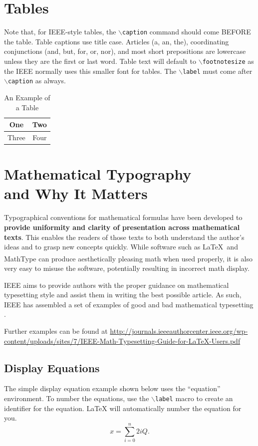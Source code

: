 \documentclass[journal,9pt]{IEEEtran}
\begin{document}
\section{Tables}
Note that, for IEEE-style tables, the
$\backslash${\tt{caption}} command should come BEFORE the table. Table captions use title case. Articles (a, an, the), coordinating conjunctions (and, but, for, or, nor), and most short prepositions are lowercase unless they are the first or last word. Table text will default to $\backslash${\tt{footnotesize}} as
the IEEE normally uses this smaller font for tables.
The $\backslash${\tt{label}} must come after $\backslash${\tt{caption}} as always.

\begin{table}[!t]
  \caption{An Example of a Table\label{tab:table1}}
  \centering
  \begin{tabular}{|c||c|}
    \hline
    One   & Two  \\
    \hline
    Three & Four \\
    \hline
  \end{tabular}
\end{table}


\section{Mathematical Typography \\ and Why It Matters}

Typographical conventions for mathematical formulas have been developed to {\bf provide uniformity and clarity of presentation across mathematical texts}. This enables the readers of those texts to both understand the author's ideas and to grasp new concepts quickly. While software such as \LaTeX \ and MathType\textsuperscript{\textregistered} can produce aesthetically pleasing math when used properly, it is also very easy to misuse the software, potentially resulting in incorrect math display.

IEEE aims to provide authors with the proper guidance on mathematical typesetting style and assist them in writing the best possible article. As such, IEEE has assembled a set of examples of good and bad mathematical typesetting \cite{ref1,ref2,ref3,ref4,ref5}.

Further examples can be found at \url{http://journals.ieeeauthorcenter.ieee.org/wp-content/uploads/sites/7/IEEE-Math-Typesetting-Guide-for-LaTeX-Users.pdf}

\subsection{Display Equations}
The simple display equation example shown below uses the ``equation'' environment. To number the equations, use the $\backslash${\tt{label}} macro to create an identifier for the equation. LaTeX will automatically number the equation for you.
\begin{equation}
  \label{deqn1}
  x = \sum_{i=0}^{n} 2{i} Q.
\end{equation}
\end{document}
